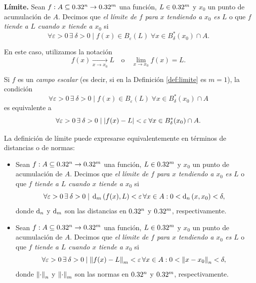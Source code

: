 \label{sec:limites}
\begin{definition} \textbf{L\'imite.} \label{def:limite}
Sean $f:A  \subseteq  0.32^n \to 0.32^m$ una funci\'on, $L \in 0.32^m$ y $x_0$ un punto de acumulaci\'on de $A$. Decimos que \emph{el l\'imite de $f$ para $x$ tendiendo a $x_0$ es $L$} o que \emph{$f$ tiende a $L$ cuando $x$ tiende a $x_0$}
si
\[
 \forall \varepsilon > 0 \, \exists\: \delta > 0 \;|\; f(x) \in B_{\varepsilon}(L) \; \forall 
 x \in B_{\delta}^*(x_0) \cap A.
\]

En este caso, utilizamos la notaci\'on
\[
 f(x) \xrightarrow[x \to x_0]{} L \quad \text{o} \quad \lim_{x \to x_0} f(x) = L.
\]
\begin{obs} Si $f$ es un \emph{campo escalar} (es decir, si en la Definici\'on \eqref{def:limite} es $m = 1$), la condici\'on 
 \[
 \forall \varepsilon > 0 \, \exists\: \delta > 0 \;|\; f(x) \in B_{\varepsilon}(L) \; \forall 
 x \in B_{\delta}^*(x_0) \cap A
\]
es equivalente a 
\[
 \forall \varepsilon > 0 \, \exists\: \delta > 0 \;|\; \abs{ f(x) - L } < \varepsilon \; \forall 
 x \in B_{\delta}^*(x_0) \cap A.
\]
\end{obs}

\begin{obs} La definici\'on de l\'imite puede expresarse equivalentemente en t\'erminos de distancias o de normas:
\begin{itemize} 
 \item Sean $f:A  \subseteq  0.32^n \to 0.32^m$ una funci\'on, $L \in 0.32^m$ y $x_0$ un punto de acumulaci\'on de $A$. Decimos que \emph{el l\'imite de $f$ para $x$ tendiendo a $x_0$ es $L$} o que \emph{$f$ tiende a $L$ cuando $x$ tiende a $x_0$} si
\[
 \forall \varepsilon > 0 \, \exists\: \delta > 0 \;|\; \operatorname{d}_m {(f(x),L)} < \varepsilon \, \forall 
 x\in A : 0 < \operatorname{d}_n {(x,x_0)} < \delta,
\] 
donde $\operatorname{d}_n$ y $\operatorname{d}_m$ son las distancias en $0.32^n$ y $0.32^m$, respectivamente.

 \item Sean $f:A  \subseteq  0.32^n \to 0.32^m$ una funci\'on, $L \in 0.32^m$ y $x_0$ un punto de acumulaci\'on de $A$. Decimos que \emph{el l\'imite de $f$ para $x$ tendiendo a $x_0$ es $L$} o que \emph{$f$ tiende a $L$ cuando $x$ tiende a $x_0$} si
\[
 \forall \varepsilon > 0 \, \exists\: \delta > 0 \;|\; \norm{f(x) - L}_m < \varepsilon \, \forall 
 x\in A : 0 < \norm{x - x_0}_n < \delta,
\] 
donde $\norm{\cdot}_n$ y $\norm{\cdot}_m$ son las normas en $0.32^n$ y $0.32^m$, respectivamente.
\end{itemize}
\end{obs}
\end{definition}



